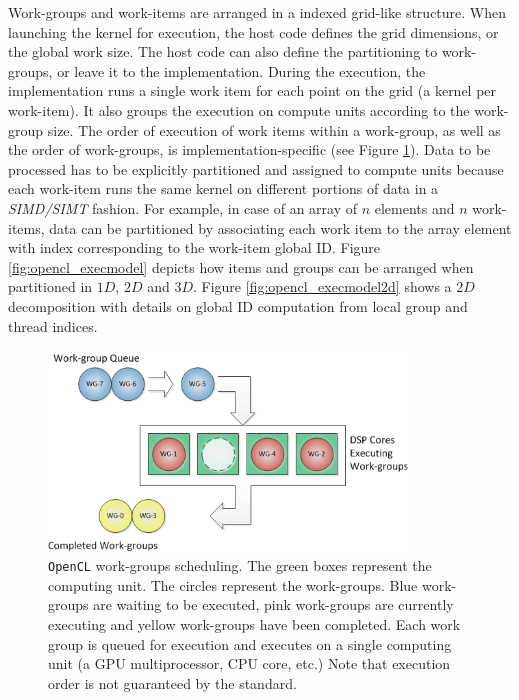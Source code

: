 \begin{description}
	Work-groups and work-items are arranged in a indexed grid-like structure. 
    When launching the kernel for execution, the host code defines the grid dimensions, or the global work size. The host code can also define the partitioning to work-groups, or leave it to the implementation. During the execution, the implementation runs a single work item for each point on the grid (a kernel per work-item). It also groups the execution on compute units according to the work-group size. The order of execution of work items within a work-group, as well as the order of work-groups, is implementation-specific (see Figure \ref{fig:work_group_execution}).
    Data to be processed has to be explicitly partitioned and assigned to compute units because each work-item runs the same kernel on different portions of data in a \textit{SIMD/SIMT} fashion. For example, in case of an array of $n$ elements and $n$ work-items, data can be partitioned by associating each work item to the array element with index corresponding to the work-item global ID. Figure \ref{fig:opencl_execmodel} depicts how items and groups can be arranged when partitioned in $1D$, $2D$ and $3D$.
    Figure \ref{fig:opencl_execmodel2d} shows a $2D$ decomposition with details on global ID computation from local group and thread indices.
    
\begin{figure}[!htbp]
    	\centering
    	\includegraphics[width=0.85\textwidth]{./images/parallel_programming/work_group_execution.png}
    	\caption[\texttt{OpenCL} work group scheduling]{\texttt{OpenCL}  work-groups scheduling. 
    	The green boxes represent the computing unit. The circles represent the work-groups. Blue work-groups are waiting to be executed, pink work-groups are currently executing and yellow work-groups have been completed. Each work group is queued for execution and executes on a single computing unit (a GPU multiprocessor, CPU core, etc.) Note that execution order is not guaranteed by the standard.}
    	\label{fig:work_group_execution}
    \end{figure}


\end{description}
